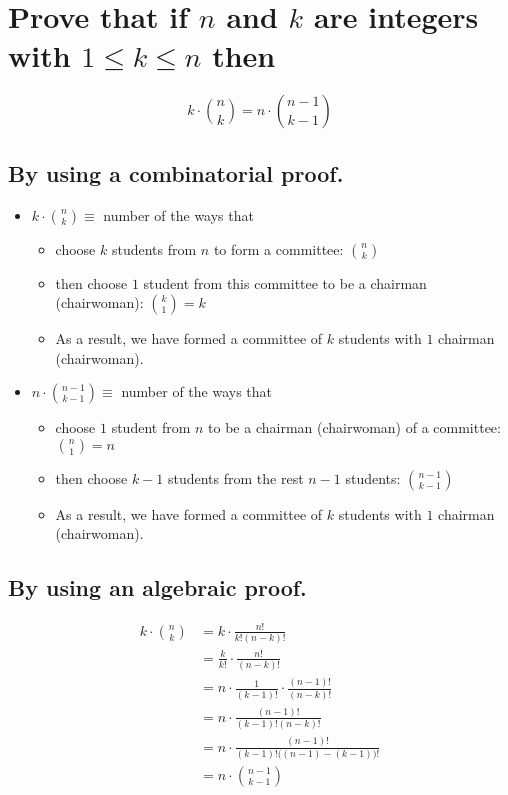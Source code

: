 \documentclass[a4paper]{article}
\begin{document}
\section{Prove that if $n$ and $k$ are integers with $1\leq k \leq n$ then}
$$
k\cdot \binom{n}{k}=n\cdot \binom{n-1}{k-1}
$$

\subsection{By using a combinatorial proof.}
\begin{itemize}
    \item $k\cdot \binom{n}{k}\equiv$ number of the ways that 
        \begin{itemize}
            \item choose $k$ students from $n$ to form a committee: $\binom{n}{k}$
            \item then choose $1$ student from this committee to be a chairman (chairwoman): $\binom{k}{1}=k$
            \item As a result, we have formed a committee of $k$ students with $1$ chairman (chairwoman).
        \end{itemize}
    \item $n\cdot \binom{n-1}{k-1}\equiv$ number of the ways that 
        \begin{itemize}
            \item choose $1$ student from $n$ to be a chairman (chairwoman) of a committee: $\binom{n}{1}=n$
            \item then choose $k-1$ students from the rest $n-1$ students: $\binom{n-1}{k-1}$
            \item As a result, we have formed a committee of $k$ students with $1$ chairman (chairwoman).
        \end{itemize}
\end{itemize}

\subsection{By using an algebraic proof.}
\begin{align*}
    k\cdot \binom{n}{k} & = k\cdot \frac{n!}{k!(n-k)!}\\
    & = \frac{k}{k!}\cdot \frac{n!}{(n-k)!}\\
    & = n \cdot \frac{1}{(k-1)!}\cdot \frac{(n-1)!}{(n-k)!}\\
    & = n \cdot \frac{(n-1)!}{(k-1)!(n-k)!}\\
    & = n \cdot \frac{(n-1)!}{(k-1)!\bigl((n-1)-(k-1)\bigr)!}\\
    & = n\cdot \binom{n-1}{k-1}\\
\end{align*}
\end{document}
